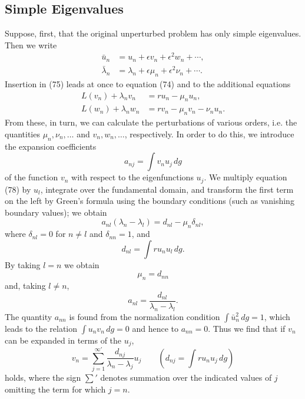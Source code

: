 \subsection{Simple Eigenvalues}
Suppose, first, that the original unperturbed problem has only simple eigenvalues. Then we write
\begin{align}
\bar u_n&=u_n+\epsilon v_n+\epsilon^2w_n+\cdots, \tag{76}\\
\bar\lambda_n&=\lambda_n+\epsilon\mu_n+\epsilon^2\nu_n+\cdots. \tag{77}
\end{align}
Insertion in (75) leads at once to equation (74) and to the additional equations
\begin{align}
L(v_n)+\lambda_nv_n&=ru_n-\mu_nu_n, \tag{78}\\
L(w_n)+\lambda_nw_n&=rv_n-\mu_nv_n-\nu_nu_n. \tag{79}
\end{align}
From these, in turn, we can calculate the perturbations of various orders, i.e. the quantities $\mu_n,\nu_n,\ldots$ and $v_n,w_n,\ldots$, respectively. In order to do this, we introduce the expansion coefficients
\[
a_{nj}=\int v_nu_j\,dg
\]
of the function $v_n$ with respect to the eigenfunctions $u_j$. We multiply equation (78) by $u_l$, integrate over the fundamental domain, and transform the first term on the left by Green's formula using the boundary conditions (such as vanishing boundary values); we obtain
\[
a_{nl}(\lambda_n-\lambda_l)=d_{nl}-\mu_n\delta_{nl},
\]
where $\delta_{nl}=0$ for $n\ne l$ and $\delta_{nn}=1$, and
\[
d_{nl}=\int ru_nu_l\,dg.
\]
By taking $l=n$ we obtain
\begin{equation}
\mu_n=d_{nn}
\tag{80}
\end{equation}
and, taking $l\ne n$,
\[
a_{nl}=\frac{d_{nl}}{\lambda_n-\lambda_l}.
\]
The quantity $a_{nn}$ is found from the normalization condition $\int \bar u_n^2\,dg=1$, which leads to the relation $\int u_nv_n\,dg=0$ and hence to $a_{nn}=0$. Thus we find that if $v_n$ can be expanded in terms of the $u_j$,
\begin{equation}
v_n=\sum_{j=1}^{\infty\prime}\frac{d_{nj}}{\lambda_n-\lambda_j}u_j
\qquad\left(d_{nj}=\int ru_nu_j\,dg\right)
\tag{81}
\end{equation}
holds, where the sign $\sum'$ denotes summation over the indicated values of $j$ omitting the term for which $j=n$.

